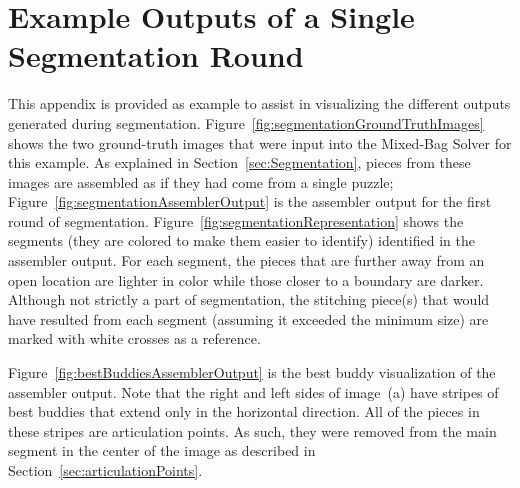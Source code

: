 \chapter{Example Outputs of a Single Segmentation Round}\label{app:segmentedOutput}

This appendix is provided as example to assist in visualizing the different outputs generated during segmentation.  Figure~\ref{fig:segmentationGroundTruthImages} shows the two ground-truth images that were input into the Mixed-Bag Solver for this example.  As explained in Section~\ref{sec:Segmentation}, pieces from these images are assembled as if they had come from a single puzzle;  Figure~\ref{fig:segmentationAssemblerOutput} is the assembler output for the first round of segmentation.  Figure~\ref{fig:segmentationRepresentation} shows the segments (they are colored to make them easier to identify) identified in the assembler output.  For each segment, the pieces that are further away from an open location are lighter in color while those closer to a boundary are darker.  Although not strictly a part of segmentation, the stitching piece(s) that would have resulted from each segment (assuming it exceeded the minimum size) are marked with white crosses as a reference.

Figure~\ref{fig:bestBuddiesAssemblerOutput} is the best buddy visualization of the assembler output.  Note that the right and left sides of image~(a) have stripes of best buddies that extend only in the horizontal direction.  All of the pieces in these stripes are articulation points.  As such, they were removed from the main segment in the center of the image as described in Section~\ref{sec:articulationPoints}.

